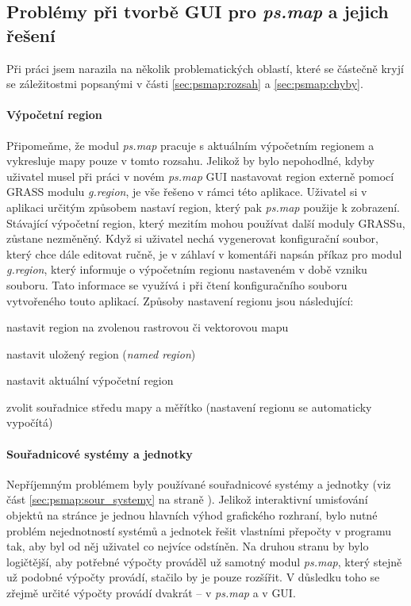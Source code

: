 \documentclass[a4paper,12pt,draft]{article}
\newcommand{\modul}[1]{\emph{#1}}
\begin{document}
\subsection[Problémy při tvorbě GUI]{Problémy při tvorbě GUI pro \modul{ps.map} a jejich řešení}
\label{sec:gui:problemy}
Při práci jsem narazila na několik problematických oblastí, které se částečně kryjí se záležitostmi popsanými v části \ref{sec:psmap:rozsah} a \ref{sec:psmap:chyby}. 

\paragraph*{Výpočetní region} Připomeňme, že modul \modul{ps.map} pracuje s aktuálním výpočetním regionem a vykresluje mapy pouze v tomto rozsahu. Jelikož by bylo nepohodlné, kdyby uživatel musel při práci v novém \modul{ps.map} GUI nastavovat region externě pomocí GRASS modulu \modul{g.region}, je vše řešeno v rámci této aplikace. Uživatel si v aplikaci určitým způsobem nastaví region, který pak \modul{ps.map} použije k zobrazení. Stávající výpočetní region, který mezitím mohou používat další moduly GRASSu, zůstane nezměněný. Když si uživatel nechá vygenerovat konfigurační soubor, který chce dále editovat ručně, je v záhlaví v komentáři napsán příkaz pro modul \modul{g.region}, který informuje o výpočetním regionu nastaveném v době vzniku souboru. Tato informace se využívá i při čtení konfiguračního souboru vytvořeného touto aplikací.  Způsoby nastavení regionu jsou následující:
\begin{enumerate*}
    \item nastavit region na zvolenou rastrovou či vektorovou mapu
    \item nastavit uložený region (\emph{named region})
    \item nastavit aktuální výpočetní region
    \item zvolit souřadnice středu mapy a měřítko (nastavení regionu se automaticky vypočítá)
\end{enumerate*}


\paragraph*{Souřadnicové systémy a jednotky} Nepříjemným problémem byly používané souřadnicové systémy a jednotky (viz část \ref{sec:psmap:sour_systemy} na straně \pageref{sec:psmap:sour_systemy}).
 Jelikož interaktivní umisťování objektů na stránce je jednou hlavních výhod grafického rozhraní, bylo nutné problém nejednotností systémů a jednotek řešit vlastními přepočty v programu tak, aby byl od něj uživatel co nejvíce odstíněn. Na druhou stranu by bylo logičtější, aby potřebné výpočty prováděl už samotný modul \modul{ps.map}, který stejně už podobné výpočty provádí, stačilo by je pouze rozšířit. V důsledku toho se zřejmě určité výpočty provádí dvakrát -- v \modul{ps.map} a v GUI.
 
\end{document}
